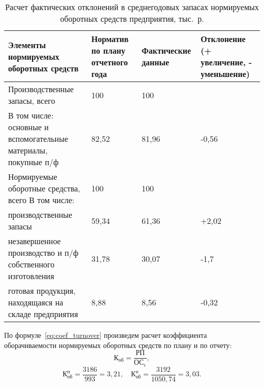 \begin{table}[h!]
  \caption{Расчет фактических отклонений в среднегодовых запасах
  нормируемых оборотных средств предприятия, тыс.~р.}
  \label{tbl:result_structure}
    \centering
    \begin{tabular}{| p{} | p{} |
                      p{} | p{} |}
      \hline
      Элементы нормируемых оборотных средств
      & Норматив по плану \newline отчетного года
      & Фактические данные
      & Отклонение \newline (+ увеличение, \newline - уменьшение) \\ 
      \hline
      
      Производственные \newline запасы, всего
      & 100
      & 100
      & \\
      \hline 

      В том числе: основные и вспомогательные материалы,
      покупные п/ф
      & 82{,}52
      & 81{,}96
      & -0{,}56 \\
      \hline 

      Нормируемые оборотные средства, всего \newline
      В том числе:
      & 100
      & 100
      & \\
      \hline 

      производственные запасы
      & 59{,}34
      & 61{,}36
      & +2{,}02 \\
      \hline 

      незавершенное производство и п/ф собственного изготовления
      & 31{,}78
      & 30{,}07
      & -1{,}7 \\
      \hline 

      готовая продукция, \newline находящаяся на складе предприятия
      & 8{,}88
      & 8{,}56
      & -0{,}32 \\
      \hline 
    \end{tabular}    
\end{table}

\newpage

По формуле~\ref{eq:coef_turnover} произведем расчет коэффициента оборачиваемости 
нормируемых оборотных средств по плану и по отчету:
\begin{equation}
\label{eq:coef_turnover}
\text{К}_\text{об} = \dfrac{\text{РП}}{\text{ОС}_\text{c}},
\end{equation}
\vspace{-1.8cm}
\begin{equation*}
\text{К}^\text{п}_\text{об} = \dfrac{3186}{993} = 3{,}21, \quad
\text{К}^\text{о}_\text{об} = \dfrac{3192}{1050{,}74} = 3{,}03. 
\end{equation*}

